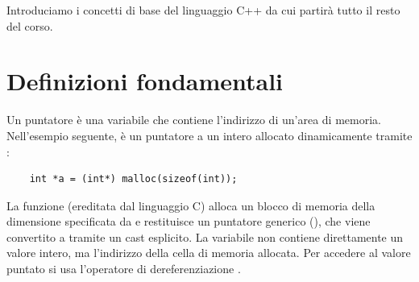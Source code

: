 \intro{}

Introduciamo i concetti di base del linguaggio C++ da cui partirà tutto il resto del corso.

\section{Definizioni fondamentali}
Un puntatore è una variabile che contiene l'indirizzo di un'area di memoria. Nell'esempio seguente,  è un puntatore a un intero allocato dinamicamente tramite :



\begin{codeexample}
\begin{lstlisting}
    int *a = (int*) malloc(sizeof(int)); 
\end{lstlisting}
\end{codeexample}
\begin{center}

\end{center}

La funzione  (ereditata dal linguaggio C) alloca un blocco di memoria della dimensione specificata da  e restituisce un puntatore generico (), che viene convertito a  tramite un cast esplicito. La variabile  non contiene direttamente un valore intero, ma l'indirizzo della cella di memoria allocata. Per accedere al valore puntato si usa l'operatore di dereferenziazione .

